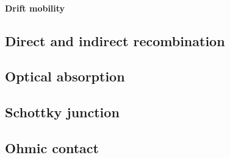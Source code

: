 \paragraph{Drift mobility}

\subsection{Direct and indirect recombination}

\subsection{Optical absorption}

\subsection{Schottky junction}

\subsection{Ohmic contact}
